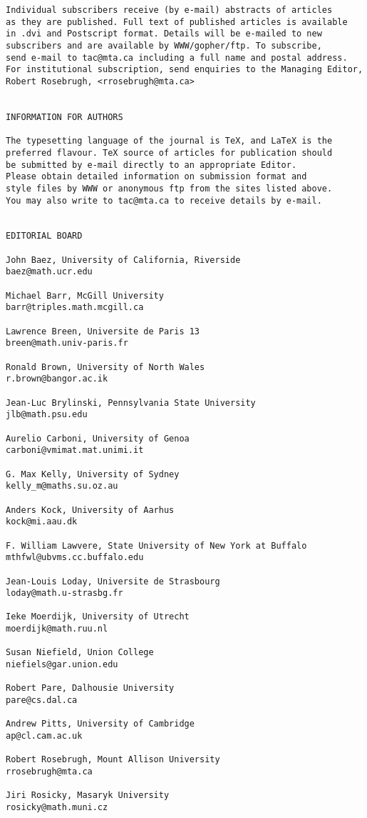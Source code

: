 \documentclass{article}
\begin{document}
\begin{verbatim}
Individual subscribers receive (by e-mail) abstracts of articles 
as they are published. Full text of published articles is available 
in .dvi and Postscript format. Details will be e-mailed to new 
subscribers and are available by WWW/gopher/ftp. To subscribe, 
send e-mail to tac@mta.ca including a full name and postal address. 
For institutional subscription, send enquiries to the Managing Editor, 
Robert Rosebrugh, <rrosebrugh@mta.ca>
 
 
INFORMATION FOR AUTHORS
 
The typesetting language of the journal is TeX, and LaTeX is the 
preferred flavour. TeX source of articles for publication should 
be submitted by e-mail directly to an appropriate Editor. 
Please obtain detailed information on submission format and 
style files by WWW or anonymous ftp from the sites listed above.
You may also write to tac@mta.ca to receive details by e-mail.
 
 
EDITORIAL BOARD
 
John Baez, University of California, Riverside
baez@math.ucr.edu
 
Michael Barr, McGill University
barr@triples.math.mcgill.ca
 
Lawrence Breen, Universite de Paris 13
breen@math.univ-paris.fr
 
Ronald Brown, University of North Wales 
r.brown@bangor.ac.ik
 
Jean-Luc Brylinski, Pennsylvania State University
jlb@math.psu.edu
 
Aurelio Carboni, University of Genoa
carboni@vmimat.mat.unimi.it
 
G. Max Kelly, University of Sydney
kelly_m@maths.su.oz.au
 
Anders Kock, University of Aarhus
kock@mi.aau.dk
 
F. William Lawvere, State University of New York at Buffalo
mthfwl@ubvms.cc.buffalo.edu
 
Jean-Louis Loday, Universite de Strasbourg
loday@math.u-strasbg.fr
 
Ieke Moerdijk, University of Utrecht
moerdijk@math.ruu.nl
 
Susan Niefield, Union College
niefiels@gar.union.edu
 
Robert Pare, Dalhousie University
pare@cs.dal.ca
 
Andrew Pitts, University of Cambridge
ap@cl.cam.ac.uk
 
Robert Rosebrugh, Mount Allison University
rrosebrugh@mta.ca
 
Jiri Rosicky, Masaryk University
rosicky@math.muni.cz
 

\end{verbatim}
\end{document}
